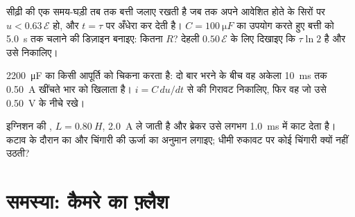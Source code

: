 \begin{exercise}[$\star\star\star$]\label{exo:g12:rc-rl-circuits:13}
सीढ़ी की एक समय-घड़ी तब तक बत्ती जलाए रखती है जब तक अपने आवेशित होते
 के सिरों पर $u < 0.63\,\mathcal{E}$ हो, और $t = \tau$ पर अँधेरा कर देती है।
$C = \qty{100}{\micro F}$ का उपयोग करते हुए बत्ती को \qty{5.0}{s} तक चलाने की डिज़ाइन बनाइए: कितना
$R$? देहली $0.50\,\mathcal{E}$ के लिए दिखाइए कि  $\tau \ln 2$ है और उसे
निकालिए।
\end{exercise}

\begin{exercise}[$\star\star\star$]\label{exo:g12:rc-rl-circuits:14}
\qty{2200}{\micro F} का  किसी आपूर्ति को चिकना करता है: दो बार भरने के
बीच वह अकेला \qty{10}{ms} तक \qty{0.50}{A} खींचते भार को खिलाता है। $i = C\,du/dt$ से
 की गिरावट निकालिए, फिर वह  जो उसे \qty{0.50}{V} के
नीचे रखे।
\end{exercise}

\begin{exercise}[$\star\star\star$]\label{exo:g12:rc-rl-circuits:15}
इग्निशन की , $L = \qty{0.80}{H}$, \qty{2.0}{A} ले जाती है और ब्रेकर उसे लगभग
\qty{1.0}{ms} में काट देता है। कटाव के दौरान  का 
और चिंगारी की ऊर्जा का अनुमान लगाइए; धीमी रुकावट पर कोई चिंगारी क्यों
नहीं उठती?
\end{exercise}

\section{समस्या: कैमरे का फ़्लैश}

